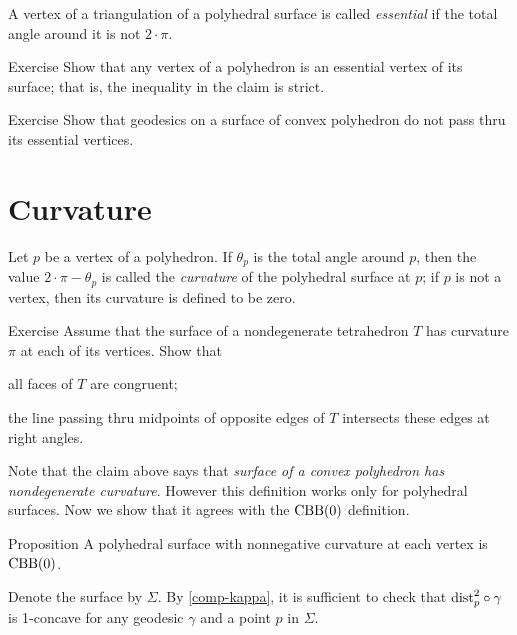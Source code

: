 A vertex of a triangulation of a polyhedral surface is called \emph{essential} if the total angle around it is not $2\cdot\pi$.

\begin{thm}{Exercise}\label{ex:vertex-essential-vertex}
Show that any vertex of a polyhedron is an essential vertex of its surface;
that is, the inequality in the claim is strict.
\end{thm}


\begin{thm}{Exercise}\label{ex:geodesic-vertex}
Show that geodesics on a surface of convex polyhedron do not pass thru its essential vertices.
\end{thm}

\section{Curvature}

Let $p$ be a vertex of a polyhedron.
If $\theta_p$ is the total angle around $p$, then the value $2\cdot \pi -\theta_p$ is called the \emph{curvature} of the polyhedral surface at $p$;
if $p$ is not a vertex, then its curvature is defined to be zero.

\begin{thm}{Exercise}\label{pr:tetrahedron} 
Assume that the surface of a nondegenerate tetrahedron $T$ has curvature $\pi$ at each of its vertices.
Show that 

\begin{subthm}{}
all faces of $T$ are congruent; 
\end{subthm}

\begin{subthm}{} the line passing thru midpoints of opposite edges of $T$ intersects these edges at right angles.
\end{subthm}
 
\end{thm}

Note that the claim above says that \textit{surface of a convex polyhedron has nondegenerate curvature}.
However this definition works only for polyhedral surfaces.
Now we show that it agrees with the $\mathrm{CBB}(0)$ definition.

\begin{thm}{Proposition}\label{prop:poly-CBB}
A polyhedral surface with nonnegative curvature at each vertex is $\mathrm{CBB}(0)$.
\end{thm}

Denote the surface by $\Sigma$.
By \ref{comp-kappa}, it is sufficient to check that 
$\mathrm{dist}_p^2\circ\gamma$ is 1-concave for any geodesic $\gamma$ and a point $p$ in $\Sigma$.

